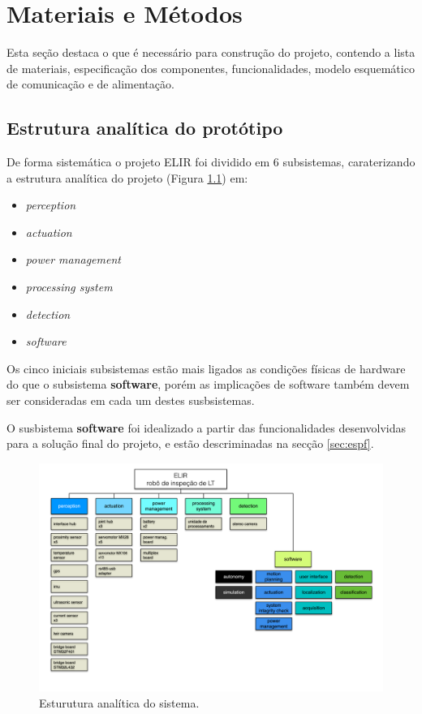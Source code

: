 \chapter{Materiais e Métodos}
\label{chap:mat}
Esta seção destaca o que é necessário para construção do projeto, contendo a lista de materiais, especificação dos componentes, funcionalidades, modelo esquemático de comunicação e de alimentação.


\section{Estrutura analítica do protótipo}
\label{ssec:pbs}
De forma sistemática o projeto ELIR foi dividido em 6 subsistemas, caraterizando a estrutura analítica do projeto (Figura \ref{fig:pbselir}) em:

\begin{itemize}
	\item \textit{perception}
	\item \textit{actuation}
	\item \textit{power management}
	\item \textit{processing system}
	\item \textit{detection}
	\item \textit{software}
\end{itemize}

Os cinco iniciais subsistemas estão mais ligados as condições físicas de hardware do que o subsistema \textbf{software}, porém as implicações de software também devem ser consideradas em cada um destes susbsistemas.

O susbistema \textbf{software} foi idealizado a partir das funcionalidades desenvolvidas  para a solução final do projeto, e estão descriminadas na secção \ref{sec:espf}.

\begin{figure}[!htb]
	\centering
	\includegraphics[scale=0.6]{Figures/pbselir.png}
	\caption{Esturutura analítica do sistema.}
	\label{fig:pbselir}
\end{figure}

